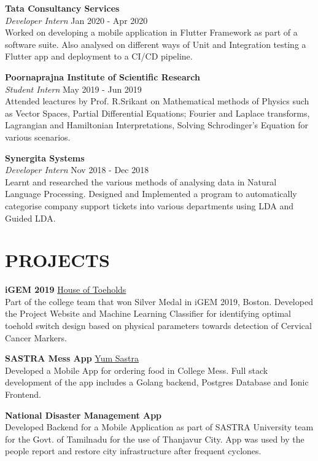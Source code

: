 \documentclass[a4paper,9pt]{extarticle}
\begin{document}
\noindent
\textbf{Tata Consultancy Services}\\[1pt]
\textit{Developer Intern} \hfill Jan 2020 - Apr 2020\\[1pt]
Worked on developing a mobile application in Flutter Framework as part of a software suite. Also analysed on different ways of
Unit and Integration testing a Flutter app and deployment to a CI/CD pipeline.

\noindent
\textbf{Poornaprajna Institute of Scientific Research}\\[1pt]
\textit{Student Intern} \hfill May 2019 - Jun 2019\\[1pt]
Attended leactures by Prof. R.Srikant on Mathematical methods of Physics such as Vector Spaces, Partial Differential Equations; Fourier and Laplace transforms, Lagrangian and Hamiltonian Interpretations, Solving Schrodinger’s
Equation for various scenarios.

\noindent
\textbf{Synergita Systems}\\[1pt]
\textit{Developer Intern} \hfill Nov 2018 - Dec 2018\\[1pt]
Learnt and researched the various methods of analysing data in Natural Language Processing. Designed and Implemented a
program to automatically categorise company support tickets into various departments using LDA and Guided LDA.

\section*{PROJECTS}
\noindent
\textbf{iGEM 2019} \hfill \href{https://2019.igem.org/Team:SASTRA_Thanjavur}{House of Toeholds \faExternalLink}\\[1pt]
Part of the college team that won Silver Medal in iGEM 2019, Boston. Developed the Project Website and Machine Learning
Classifier for identifying optimal toehold switch design based on physical parameters towards detection of Cervical Cancer
Markers.

\noindent
\textbf{SASTRA Mess App} \hfill \href{https://yumsastra.vathzen.in}{Yum Sastra \faExternalLink}\\[1pt]
Developed a Mobile App for ordering food in College Mess. Full stack development of the app includes a Golang backend,
Postgres Database and Ionic Frontend.

\noindent
\textbf{National Disaster Management App}\\[1pt]
Developed Backend for a Mobile Application as part of SASTRA University team for the Govt. of Tamilnadu for the use of
Thanjavur City. App was used by the people report and restore city infrastructure after frequent cyclones.
\end{document}
